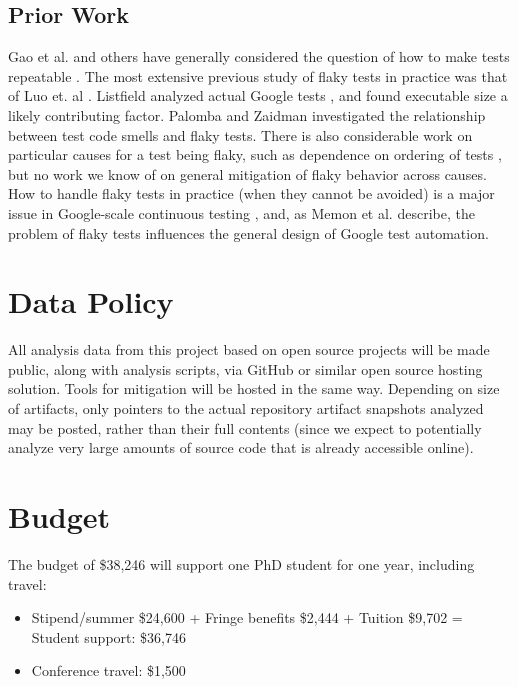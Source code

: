 \documentclass[10pt]{article}
\begin{document}
\subsection{Prior Work}


Gao et al. and others have generally considered the question of how to make tests repeatable \cite{Gao:2015:MSU:2818754.2818764}.  
The most extensive previous study of flaky tests in practice was that of Luo et. al \cite{luo2014empirical}.  Listfield analyzed actual Google tests \cite{listfieldtestanalysis}, and found executable size a likely contributing factor. Palomba and Zaidman \cite{palomba2017does} investigated the relationship between test code smells and flaky tests.  There is also considerable work on particular causes for a test being flaky, such as dependence on ordering of tests \cite{LamZE2015}, but no work we know of on general mitigation of flaky behavior across causes.  How to handle flaky tests in practice (when they cannot be avoided) is a major issue in Google-scale continuous testing \cite{memon2017taming}, and, as Memon et al. describe, the problem of flaky tests influences the general design of Google test automation.




\section{Data Policy}

All analysis data from this project based on open source projects will be made public, along with analysis scripts, via GitHub or similar open source hosting solution.  Tools for mitigation will be hosted in the same way.  Depending on size of artifacts, only pointers to the actual repository artifact snapshots analyzed may be posted, rather than their full contents (since we expect to potentially analyze very large amounts of source code that is already accessible online).

\section{Budget}

The budget of \$38,246 will support one PhD student for one year, including travel:

{
\begin{itemize}
\item Stipend/summer \$24,600 + Fringe benefits \$2,444 + Tuition \$9,702 = Student support: \$36,746
\item Conference travel: \$1,500
\end{itemize}
}
\end{document}
